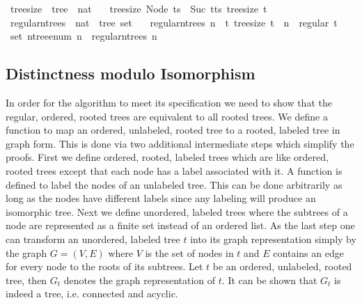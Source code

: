 \begin{isabellebox}
    \isamarkupfalse%
    \ tree{\isacharunderscore}{\kern0pt}size\ {\isacharcolon}{\kern0pt}{\isacharcolon}{\kern0pt}\ {\isachardoublequoteopen}tree\ {\isasymRightarrow}\ nat{\isachardoublequoteclose}\ \isanewline
    \ \ {\isachardoublequoteopen}tree{\isacharunderscore}{\kern0pt}size\ {\isacharparenleft}{\kern0pt}Node\ ts{\isacharparenright}{\kern0pt}\ {\isacharequal}{\kern0pt}\ Suc\ {\isacharparenleft}{\kern0pt}{\isasymSum}t{\isasymleftarrow}ts{\isachardot}{\kern0pt}\ tree{\isacharunderscore}{\kern0pt}size\ t{\isacharparenright}{\kern0pt}{\isachardoublequoteclose}\isanewline
    \isanewline
    \isamarkupfalse%
    \ regular{\isacharunderscore}{\kern0pt}n{\isacharunderscore}{\kern0pt}trees\ {\isacharcolon}{\kern0pt}{\isacharcolon}{\kern0pt}\ {\isachardoublequoteopen}nat\ {\isasymRightarrow}\ tree\ set{\isachardoublequoteclose}\ \isanewline
    \ \ {\isachardoublequoteopen}regular{\isacharunderscore}{\kern0pt}n{\isacharunderscore}{\kern0pt}trees\ n\ {\isacharequal}{\kern0pt}\ {\isacharbraceleft}{\kern0pt}t{\isachardot}{\kern0pt}\ tree{\isacharunderscore}{\kern0pt}size\ t\ {\isacharequal}{\kern0pt}\ n\ {\isasymand}\ regular\ t{\isacharbraceright}{\kern0pt}{\isachardoublequoteclose}%
    \isanewline\isanewline
    \isamarkupfalse%
    \ {\isachardoublequoteopen}set\ {\isacharparenleft}{\kern0pt}n{\isacharunderscore}{\kern0pt}tree{\isacharunderscore}{\kern0pt}enum\ n{\isacharparenright}{\kern0pt}\ {\isacharequal}{\kern0pt}\ regular{\isacharunderscore}{\kern0pt}n{\isacharunderscore}{\kern0pt}trees\ n{\isachardoublequoteclose}
\end{isabellebox}

\subsection{Distinctness modulo Isomorphism}

In order for the algorithm to meet its specification we need to show that the regular, ordered, rooted trees are equivalent to all rooted trees.
We define a function to map an ordered, unlabeled, rooted tree to a rooted, labeled tree in graph form.
This is done via two additional intermediate steps which simplify the proofs.
First we define ordered, rooted, labeled trees which are like ordered, rooted trees except that each node has a label associated with it.
A function is defined to label the nodes of an unlabeled tree.
This can be done arbitrarily as long as the nodes have different labels since any labeling will produce an isomorphic tree.
Next we define unordered, labeled trees where the subtrees of a node are represented as a finite set instead of an ordered list.
As the last step one can transform an unordered, labeled tree $t$ into its graph representation simply by the graph $G = (V,E)$ where $V$ is the set of nodes in $t$ and $E$ contains an edge for every node to the roots of its subtrees.
Let $t$ be an ordered, unlabeled, rooted tree, then $G_t$ denotes the graph representation of $t$.
It can be shown that $G_t$ is indeed a tree, i.e. connected and acyclic.

